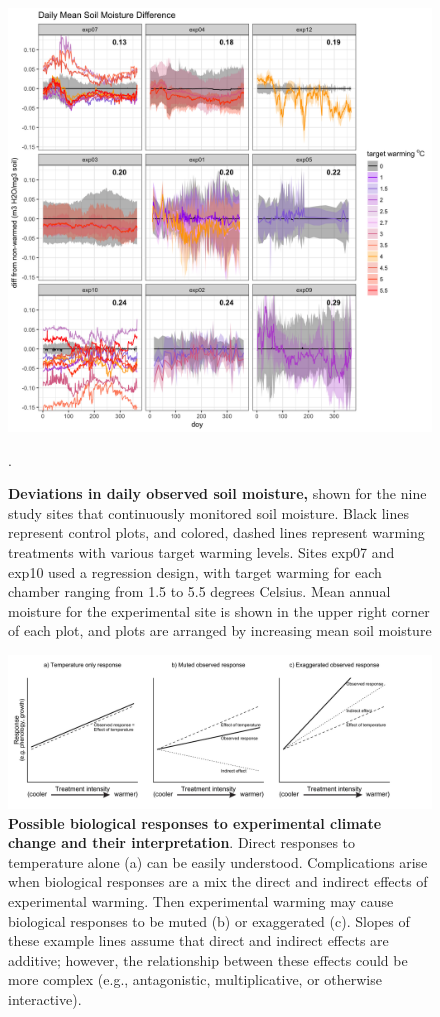 \documentclass{article}
\begin{document}
 \begin{figure}[h]
    \centering
 \includegraphics{../Analyses/figures/Exploratory_TimeSeries_SoilMoist_Deviation.png}  
 \caption{\textbf{Deviations in daily observed soil moisture,} shown for the nine  study sites that continuously monitored soil moisture. Black lines represent control plots, and colored, dashed lines represent warming treatments with various target warming levels. Sites exp07 and exp10 used a regression design, with target warming for each chamber ranging from 1.5 to 5.5 degrees Celsius. Mean annual moisture for the experimental site is shown in the upper right corner of each plot, and plots are arranged by increasing mean soil moisture}. %
 \label{fig:mois}
 \end{figure}
 \begin{figure}[h]
 \includegraphics{../Analyses/figures/DirIndWarmingEffects.pdf} 
 \caption{\textbf{Possible biological responses to experimental climate change and their interpretation}. Direct responses to temperature alone (a) can be easily understood. Complications arise when biological responses are a mix the direct and indirect effects of experimental warming. Then experimental warming may cause biological responses to be muted (b) or exaggerated (c). Slopes of these example lines assume that direct and indirect effects are additive; however, the relationship between these effects could be more complex (e.g., antagonistic, multiplicative, or otherwise interactive).} 
\label{fig:biolimp}
  \end{figure}
\end{document}

